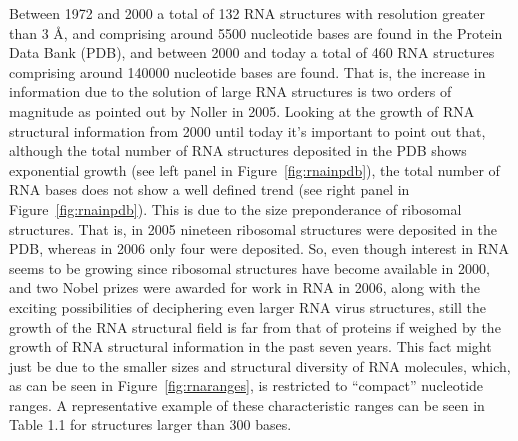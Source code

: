 \noindent Between  1972 and  2000 a total  of 132 RNA  structures with
resolution greater  than 3 \AA, and comprising  around 5500 nucleotide
bases are found in the Protein  Data Bank (PDB), and between 2000 and
today  a  total of  460  RNA  structures comprising  around
140000 nucleotide  bases are found.  That  is, the  increase in
information due to the solution  of large RNA structures is two orders
of   magnitude  as   pointed  out   by  Noller   \cite{noller2005}  in
2005. Looking  at the growth  of RNA structural information  from 2000
until  today it's  important to  point  out that,  although the  total
number of RNA structures deposited in the PDB shows exponential growth
(see left panel in Figure~\ref{fig:rnainpdb}), the total number of RNA
bases  does  not  show  a  well  defined trend  (see  right  panel  in
Figure~\ref{fig:rnainpdb}).  This is due  to the size preponderance of
ribosomal structures.  That is, in 2005  nineteen ribosomal structures
were deposited in  the PDB, whereas in 2006  only four were deposited.
So, even  though interest in RNA  seems to be  growing since ribosomal
structures have  become available in  2000, and two Nobel  prizes were
awarded for work in RNA in 2006, along with the exciting possibilities
of  deciphering even larger  RNA virus  structures, still
the growth of the RNA structural field is far from that of proteins if
weighed by the growth of  RNA structural information in the past seven
years. This fact might just be due to the smaller sizes and structural
diversity   of   RNA   molecules,   which,   as   can   be   seen   in
Figure~\ref{fig:rnaranges},  is restricted  to  ``compact'' nucleotide
ranges.
A representative example of these  characteristic ranges can be seen in
Table 1.1 for structures larger than 300 bases.

